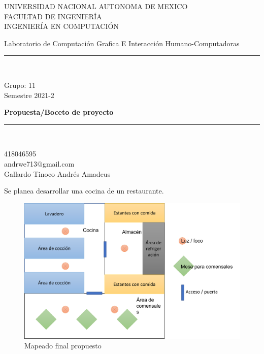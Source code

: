 \documentclass[letter,12pt]{article}
\begin{document}
\begin{titlepage}
	
	\begin{center}
		\vspace*{-1in}

		
		UNIVERSIDAD NACIONAL AUTONOMA DE MEXICO\\
		\vspace*{0.15in}
		FACULTAD DE INGENIERÍA \\
		\vspace*{0.15in}
		INGENIERÍA EN COMPUTACIÓN \\
		\vspace*{0.6in}
		\begin{large}
			Laboratorio de Computación Grafica E Interacción Humano-Computadoras\\
		\end{large}
		\vspace*{0.1in}
		\rule{160mm}{0.1mm}\\
		\vspace*{0.1in}
		\begin{large}
			Grupo: 11\\
			Semestre 2021-2\\
		\end{large}
		\vspace*{0.2in}
		\begin{Large}
			\textbf{Propuesta/Boceto de proyecto} \\
		\end{Large}
		\vspace*{0.3in}
		\rule{80mm}{0.1mm}\\
		\vspace*{0.1in}
		\begin{large}
			418046595 \\
			andrwe713@gmail.com \\
			Gallardo Tinoco Andrés Amadeus\\
		\end{large}
	\end{center}
	
\end{titlepage}
\newpage
Se planea desarrollar una cocina de un restaurante.
	\begin{figure}[H]
		\includegraphics[scale=0.6]{img1}
		\centering
		\caption{Mapeado final propuesto}
	\end{figure}
\end{document}
